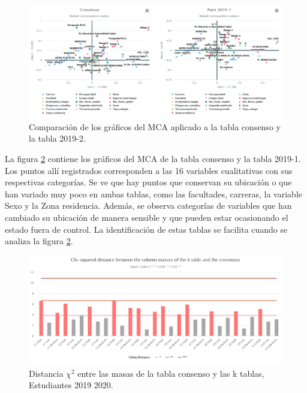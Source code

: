 \documentclass[water,article,submit,moreauthors,pdftex]{mdpi}
\begin{document}
\begin{figure}[!ht]



\begin{center}\includegraphics[width=0.8\linewidth,]{conspointedu} \end{center}

\caption{Comparación de los gráficos del MCA aplicado a la tabla consenso y la tabla 2019-2.}

\label{fig:conspointedu}
\end{figure}

La figura \ref{fig:conspointedu} contiene los gráficos del MCA de la
tabla consenso y la tabla 2019-1. Los puntos allí registrados
corresponden a las 16 variables cualitativas con sus respectivas
categorías. Se ve que hay puntos que conservan su ubicación o que han
variado muy poco en ambas tablas, como las facultades, carreras, la
variable Sexo y la Zona residencia. Además, se observa categorías de
variables que han cambiado su ubicación de manera sensible y que pueden
estar ocasionando el estado fuera de control. La identificación de estas
tablas se facilita cuando se analiza la figura \ref{fig:conspointedu}.

\begin{figure}[!ht]



\begin{center}\includegraphics[width=0.6\linewidth,]{chibar} \end{center}

\caption{Distancia $\chi^2$ entre las masas de la tabla consenso y las k tablas, Estudiantes 2019 2020.}

\label{fig:conspointedu}
\end{figure}
\end{document}
